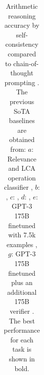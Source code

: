 \documentclass{article} %
\begin{document}
\begin{table}[h]
\begin{tabular}{cl  llllll}
    \bottomrule
    \end{tabular}
    \vspace{-0.1in}
    \caption{Arithmetic reasoning accuracy by self-consistency compared to chain-of-thought prompting \citep{wei2022chain}.
    The previous SoTA baselines are obtained from: 
    $a$: Relevance and LCA operation classifier \citep{roy-roth-2015-solving},
    $b$: \cite{lan2021mwptoolkit},
    $c$: \cite{amini-etal-2019-mathqa},
    $d$: \cite{pi2022reasoning},
    $e$: GPT-3 175B finetuned with 7.5k examples \citep{cobbe2021training},
    $g$: GPT-3 175B finetuned plus an additional 175B verifier \citep{cobbe2021training}. The best performance for each task is shown in bold.}
    \label{tab:sota}
\vspace{-0.1in}
\end{table}
\end{document}
